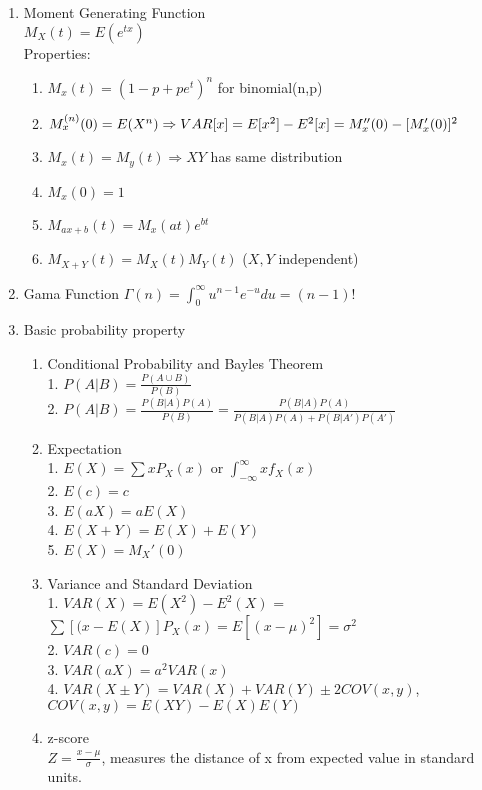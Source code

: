 \documentclass[10pt]{article}
\begin{document}
  
	\begin{multicols}{2}
		\begin{enumerate}
			\item Moment Generating Function\\
			$M_X(t) = E(e^{tx})$\\
			Properties:
			\begin{enumerate}
				\item $M_x(t) = (1-p+pe^t)^n$ for binomial(n,p)
				\item $M_x^{(n)}(0) = E(X^n) \\ \Rightarrow VAR[x]=E[x^2] - E^2[x] = M_x''(0) - [M_x'(0)]^2 $
				\item $M_x(t) = M_y(t) \Rightarrow X Y$ has same distribution
				\item $M_x(0) = 1$
				\item $M_{ax + b}(t) = M_x(at)e^{bt}$
				\item $M_{X+Y}(t) = M_X(t)M_Y(t)$ ($X,Y$ independent)
			\end{enumerate}
			
			\item Gama Function
			$\Gamma(n) = \int_{0}^{\infty}u^{n-1}e^{-u}du = (n-1)!$
			
			\item Basic probability property
			\begin{enumerate}
				\item Conditional Probability and Bayles Theorem\\
				1. $P(A|B) = \frac{P(A\cup B)}{P(B)}$\\
				2. $P(A|B) = \frac{P(B|A)P(A)}{P(B)} = \frac{P(B|A)P(A)}{P(B|A)P(A) + P(B|A')P(A')} $
				\item Expectation\\
				1. $E(X) = \sum xP_X(x)$ or $\int_{-\infty}^{\infty}xf_X(x)$\\
				2. $E(c) = c$\\
				3. $E(aX) = aE(X)$\\
				4. $E(X+Y) = E(X) + E(Y)$\\
				5. $E(X) = M_X'(0)$
				\item Variance and Standard Deviation\\
				1. $VAR(X) = E(X^2)-E^2(X)$ = $\sum[(x-E(X)]P_X(x) = E[(x-\mu)^2] = \sigma^2$\\
				2. $VAR(c) = 0$\\
				3. $VAR(aX) = a^2VAR(x)$\\
				4. $VAR(X\pm Y) = VAR(X) + VAR(Y) \pm 2COV(x,y)$, $COV(x,y) = E(XY)-E(X)E(Y)$
				\item z-score\\
				$Z = \frac{x-\mu}{\sigma}$, measures the distance of x from expected value in standard units.
			\end{enumerate}
			

\end{enumerate}
\end{multicols}
\end{document}
